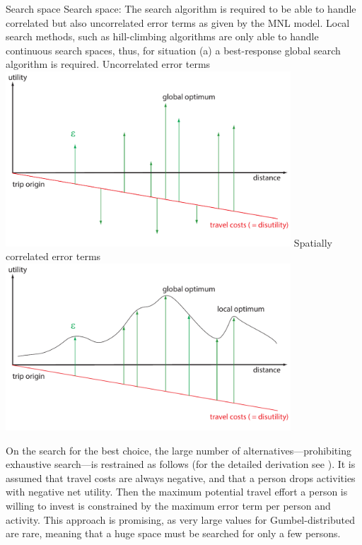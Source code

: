 \createfigure%
{Search space}%
{Search space: The search algorithm is required to be able to handle correlated but also uncorrelated error terms as given by the MNL model. Local search methods, such as hill-climbing algorithms are only able to handle continuous search spaces, thus, for situation (a) a best-response global search algorithm is required.}%
{\label{fig:landscape}}%
{%
  \createsubfigure%
  {Uncorrelated error terms}%
  {\includegraphics[width=0.8\textwidth,angle=0]{extending/figures/dc/landscape1.pdf}}%
  {\label{fig:landscape0}}%
  {}%
  \createsubfigure%
  {Spatially correlated error terms}%
	{\includegraphics[width=0.8\textwidth,angle=0]{extending/figures/dc/landscape0.pdf}}%
  {\label{fig:landscape1}}%
  {}%
}%
{}

On the search for the best choice, the large number of alternatives---prohibiting exhaustive search---is restrained as follows (for the detailed derivation see \citet[][p.51 ff.]{Horni_PhDThesis_2013}). It is assumed that travel costs are always negative, and that a person drops activities with negative net utility. Then the maximum potential travel effort a person is willing to invest is constrained by the maximum error term per person and activity. This approach is promising, as very large values for Gumbel-distributed are rare, meaning that a huge space must be searched for only a few persons. 

